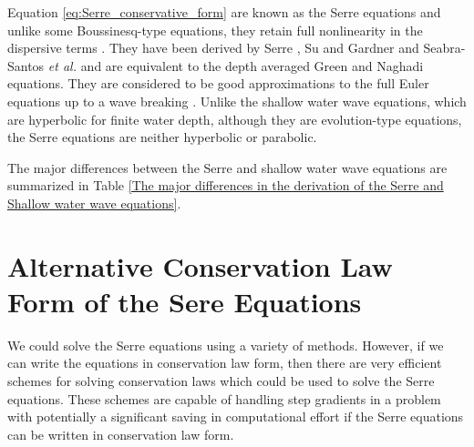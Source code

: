 \documentclass[SingleSpace,12pt]{Serre_ASCE}
\begin{document}
Equation \eqref{eq:Serre_conservative_form} are known as the Serre equations \cite{Serre-F-1953-857,Seabra-Santos-etal-1987-117,Carter-Cienfuegos-2010-259} and unlike some Boussinesq-type equations, they retain full nonlinearity in the dispersive terms \cite{El-etal-2006}. They have been derived by Serre \cite{Serre-F-1953-857}, Su and Gardner \cite{Su-Gardener-1969-536} and Seabra-Santos \emph{et al.} \cite{Seabra-Santos-etal-1987-117} and are equivalent to the depth averaged Green and Naghadi \cite{Green-Naghdi-1976-237} equations. They are considered to be good approximations to the full Euler equations up to a wave breaking \cite{Bonneton-etal-2011-1479,Bonneton-etal-2011-589}. Unlike the shallow water wave equations, which are hyperbolic for finite water depth, although they are evolution-type equations, the Serre equations are neither hyperbolic or parabolic.

The major differences between the Serre and shallow water wave equations are summarized in Table \ref{The major differences in the derivation of the Serre and Shallow water wave equations}.

\section{Alternative Conservation Law Form of the Sere Equations}
\label{section:Alternative Conservation Law Form of the Sere Equations}

We could solve the Serre equations using a variety of methods. However, if we can write the equations in conservation law form, then there are very efficient schemes for solving conservation laws which could be used to solve the Serre equations. These schemes are capable of handling step gradients in a problem with potentially a significant saving in computational effort if the Serre equations can be written in conservation law form.
\end{document}
